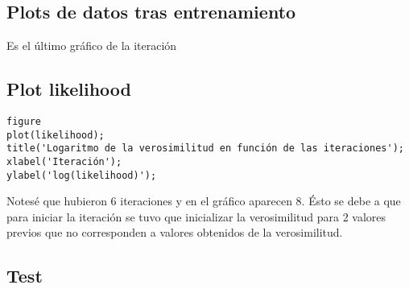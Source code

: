 
{}
\subsection*{Plots de datos tras entrenamiento}



Es el último gráfico de la iteración



{}
\subsection*{Plot likelihood}

\begin{lstlisting}
figure
plot(likelihood);
title('Logaritmo de la verosimilitud en función de las iteraciones');
xlabel('Iteración');
ylabel('log(likelihood)');
\end{lstlisting}


Notesé que hubieron 6 iteraciones y en el gráfico aparecen 8. Ésto se debe a que para iniciar la iteración se tuvo que inicializar la verosimilitud para 2 valores previos que no corresponden a valores obtenidos de la verosimilitud.


{}
\subsection*{Test}

